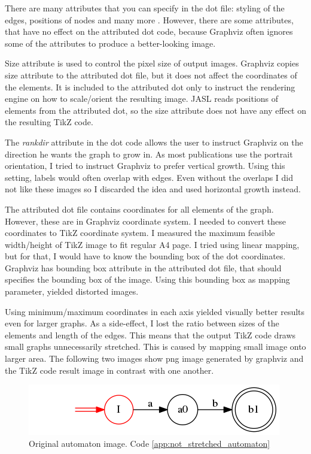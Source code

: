 \documentclass{ctuthesis}
\begin{document}
There are many attributes that you can specify in the dot file: styling of the edges, positions of nodes and many more \cite{dot-notation}. However, there are some attributes, that have no effect on the attributed dot code, because Graphviz often ignores some of the attributes to produce a better-looking image. 

Size attribute is used to control the pixel size of output images. Graphviz copies size attribute to the attributed dot file, but it does not affect the coordinates of the elements. It is included to the attributed dot only to instruct the rendering engine on how to scale/orient the resulting image. JASL reads positions of elements from the attributed dot, so the size attribute does not have any effect on the resulting TikZ code.

The \textit{rankdir} attribute in the dot code allows the user to instruct Graphviz on the direction he wants the graph to grow in. As most publications use the portrait orientation, I tried to instruct Graphviz to prefer vertical growth. Using this setting, labels would often overlap with edges. Even without the overlaps I did not like these images so I discarded the idea and used horizontal growth instead. 

The attributed dot file contains coordinates for all elements of the graph. However, these are in Graphviz coordinate system. I needed to convert these coordinates to TikZ coordinate system. I measured the maximum feasible width/height of TikZ image to fit regular A4 page. I tried using linear mapping, but for that, I would have to know the bounding box of the dot coordinates. Graphviz has bounding box attribute in the attributed dot file, that should specifies the bounding box of the image. Using this bounding box as mapping parameter, yielded distorted images.  

Using minimum/maximum coordinates in each axis yielded visually better results even for larger graphs. As a side-effect, I lost the ratio between sizes of the elements and length of the edges. This means that the output TikZ code draws small graphs unnecessarily stretched. This is caused by mapping small image onto larger area. The following two images show png image generated by graphviz and the TikZ code result image in contrast with one another. 

\begin{figure}[H]
\includegraphics[width=0.5\linewidth]{figures/not_stretched.png}
\caption{Original automaton image. Code \ref{app:not_stretched_automaton}}
\label{fig:not_stretched_automaton}
\end{figure}
\end{document}

